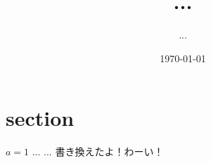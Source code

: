 \documentclass[11pt,a4paper]{jsarticle}
\title{...}
\author{...}
\date{\today}
\begin{document}
\maketitle
%
%
\section{section}
$a=1$
...
...
書き換えたよ！わーい！
\end{document}

